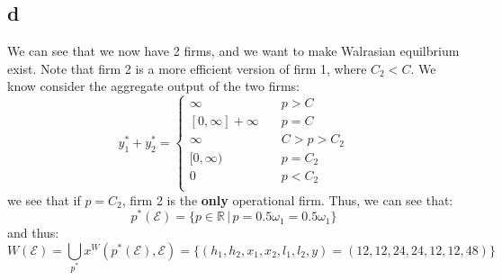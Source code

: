 \documentclass[11pt]{article}
\newcommand{\R}{\mathbb{R}}
\begin{document}
\subsection*{d}
We can see that we now have 2 firms, and we want to make Walrasian equilbrium exist. Note that firm 2 is a more efficient version of firm 1, where $C_2 < C$. We know consider the aggregate output of the two firms:
\[
y^*_1 + y^*_2 = \begin{cases}
    \infty & \quad p > C\\
    [0,\infty] + \infty & \quad p = C \\
    \infty & \quad C> p > C_2\\
    [0, \infty) & \quad p = C_2\\
    0 & \quad p < C_2\\
\end{cases}
\]
we see that if $p = C_2$, firm 2 is the \textbf{only} operational firm. Thus, we can see that:
\[
p^*(\mathcal{E}) = \{ p \in \R \hspace{2pt} | \hspace{2pt} p = 0.5\omega_1 = 0.5\omega_1\}
\]
and thus:
\[
    W(\mathcal{E}) = \bigcup_{p^*} x^W(p^*(\mathcal{E}), \mathcal{E}) = \{(h_1, h_2, x_1, x_2, l_1, l_2, y) = (12,12,24,24,12, 12 ,48)\}
\]
\end{document}

